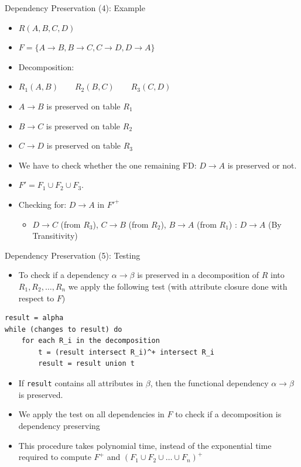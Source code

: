 \documentclass[aspectratio=169, xcolor=dvipsnames]{beamer}
\begin{document}
\begin{frame}{Dependency Preservation (4): Example}
    \begin{itemize}[<+->]
        \item $R(A, B, C, D)$
        \item $F = \{A \rightarrow B, B \rightarrow C, C \rightarrow D, D \rightarrow A\}$
        \item Decomposition:
        \item $R_1(A, B) \qquad R_2(B, C) \qquad R_3(C, D)$
        \item $A \rightarrow B$ is preserved on table $R_1$
        \item $B \rightarrow C$ is preserved on table $R_2$
        \item $C \rightarrow D$ is preserved on table $R_3$
        \item We have to check whether the one remaining FD: $D \rightarrow A$ is preserved or not.
        \item $F' = F_1 \cup F_2 \cup F_3$.
        \item Checking for: $D \rightarrow A$ in $F'^+$
        \begin{itemize}
            \item[$\triangleright$] $D \rightarrow C$ (from $R_3$), $C \rightarrow B$ (from $R_2$), $B \rightarrow A$ (from $R_1$) : $D \rightarrow A$ (By Transitivity)
        \end{itemize}
    \end{itemize}
    \vspace{1em}
\end{frame}

\begin{frame}[fragile]{Dependency Preservation (5): Testing}
    \begin{itemize}[<+->]
        \item To check if a dependency $\alpha \rightarrow \beta$ is preserved in a decomposition of $R$ into $R_1, R_2, \dots, R_n$ we apply the following test (with attribute closure done with respect to $F$)
    \end{itemize}
    \vspace{0.5em}
    \begin{verbatim}
result = alpha
while (changes to result) do
    for each R_i in the decomposition
        t = (result intersect R_i)^+ intersect R_i
        result = result union t
    \end{verbatim}
    \begin{itemize}[<+(2)->]
        \item If \texttt{result} contains all attributes in $\beta$, then the functional dependency $\alpha \rightarrow \beta$ is preserved.
        \item We apply the test on all dependencies in $F$ to check if a decomposition is dependency preserving
        \item This procedure takes polynomial time, instead of the exponential time required to compute $F^+$ and $(F_1 \cup F_2 \cup \dots \cup F_n)^+$
    \end{itemize}
\end{frame}
\end{document}
